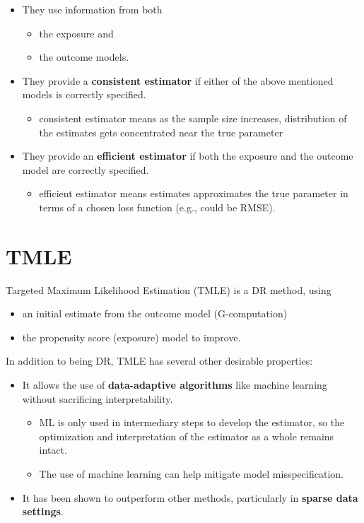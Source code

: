 \documentclass[
]{book}
\providecommand{\tightlist}{%
  \setlength{\itemsep}{0pt}\setlength{\parskip}{0pt}}
\begin{document}
\begin{itemize}
\tightlist
\item
  They use information from both

  \begin{itemize}
  \tightlist
  \item
    the exposure and
  \item
    the outcome models.
  \end{itemize}
\item
  They provide a \textbf{consistent estimator} if either of the above mentioned models is correctly specified.

  \begin{itemize}
  \tightlist
  \item
    consistent estimator means as the sample size increases, distribution of the estimates gets concentrated near the true parameter
  \end{itemize}
\item
  They provide an \textbf{efficient estimator} if both the exposure and the outcome model are correctly specified.

  \begin{itemize}
  \tightlist
  \item
    efficient estimator means estimates approximates the true parameter in terms of a chosen loss function (e.g., could be RMSE).
  \end{itemize}
\end{itemize}

\hypertarget{tmle-1}{%
\section{TMLE}\label{tmle-1}}

Targeted Maximum Likelihood Estimation (TMLE) is a DR method, using

\begin{itemize}
\tightlist
\item
  an initial estimate from the outcome model (G-computation)
\item
  the propensity score (exposure) model to improve.
\end{itemize}

In addition to being DR, TMLE has several other desirable properties:

\begin{itemize}
\tightlist
\item
  It allows the use of \textbf{data-adaptive algorithms} like machine learning without sacrificing interpretability.

  \begin{itemize}
  \tightlist
  \item
    ML is only used in intermediary steps to develop the estimator, so the optimization and interpretation of the estimator as a whole remains intact.
  \item
    The use of machine learning can help mitigate model misspecification.
  \end{itemize}
\item
  It has been shown to outperform other methods, particularly in \textbf{sparse data settings}.
\end{itemize}
\end{document}
